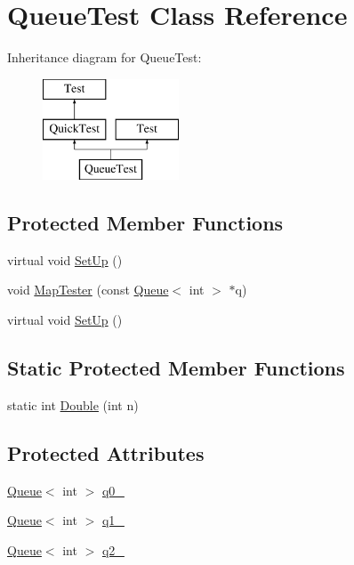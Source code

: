 \hypertarget{classQueueTest}{\section{\-Queue\-Test \-Class \-Reference}
\label{dc/d3d/classQueueTest}
}
\-Inheritance diagram for \-Queue\-Test\-:\begin{figure}[H]
\begin{center}
\leavevmode
\includegraphics[height=3.000000cm]{dc/d3d/classQueueTest}
\end{center}
\end{figure}
\subsection*{\-Protected \-Member \-Functions}
\begin{DoxyCompactItemize}
\item 
virtual void \hyperlink{classQueueTest_a901706a587f9ae84df8b2395fbe759cb}{\-Set\-Up} ()
\item 
void \hyperlink{classQueueTest_a8c80a59d070b3a952d1ad6204cda96a3}{\-Map\-Tester} (const \hyperlink{classQueue}{\-Queue}$<$ int $>$ $\ast$q)
\item 
virtual void \hyperlink{classQueueTest_a901706a587f9ae84df8b2395fbe759cb}{\-Set\-Up} ()
\end{DoxyCompactItemize}
\subsection*{\-Static \-Protected \-Member \-Functions}
\begin{DoxyCompactItemize}
\item 
static int \hyperlink{classQueueTest_ac874e206168b1b5c5f3ae74a8953ae3d}{\-Double} (int n)
\end{DoxyCompactItemize}
\subsection*{\-Protected \-Attributes}
\begin{DoxyCompactItemize}
\item 
\hyperlink{classQueue}{\-Queue}$<$ int $>$ \hyperlink{classQueueTest_a2dcfad38001f7e4ec3072c6a7165070d}{q0\-\_\-}
\item 
\hyperlink{classQueue}{\-Queue}$<$ int $>$ \hyperlink{classQueueTest_ab467b210bbd552ad64f773c8a91fef7d}{q1\-\_\-}
\item 
\hyperlink{classQueue}{\-Queue}$<$ int $>$ \hyperlink{classQueueTest_aa91a3d33874b8f83f6654b7ed77112da}{q2\-\_\-}
\end{DoxyCompactItemize}


